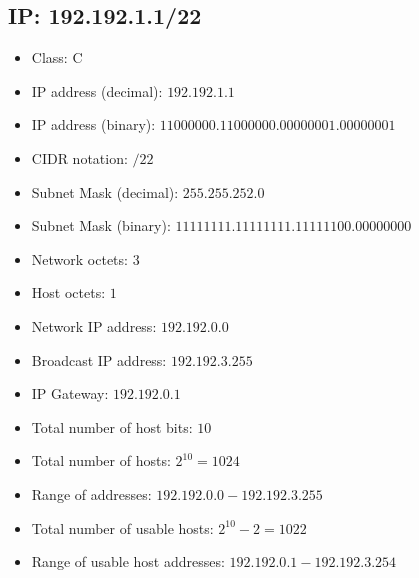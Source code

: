 \documentclass{article}
\begin{document}
\subsection*{IP: 192.192.1.1/22}
  \begin{itemize}
    \item Class: C
    \item IP address (decimal): $192.192.1.1$
    \item IP address (binary): $11000000.11000000.00000001.00000001$
    \item CIDR notation: $/22$
    \item Subnet Mask (decimal): $255.255.252.0$ 
    \item Subnet Mask (binary): $11111111.11111111.11111100.00000000$
    \item Network octets: $3$
    \item Host octets: $1$
    \item Network IP address: $192.192.0.0$
    \item Broadcast IP address: $192.192.3.255$
    \item IP Gateway: $192.192.0.1$
    \item Total number of host bits: $10$
    \item Total number of hosts: $2^{10} = 1024$
    \item Range of addresses: $192.192.0.0 - 192.192.3.255$
    \item Total number of usable hosts: $2^{10} - 2 = 1022$
    \item Range of usable host addresses: $192.192.0.1 - 192.192.3.254$
  \end{itemize}
\end{document}
